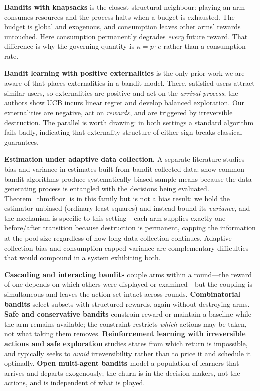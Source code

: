 \textbf{Bandits with knapsacks} \citep{badanidiyuru2013} is the closest structural
neighbour: playing an arm consumes resources and the process halts when a budget is
exhausted. The budget is global and exogenous, and consumption leaves other arms'
rewards untouched. Here consumption permanently degrades \emph{every} future
reward. That difference is why the governing quantity is $\kappa = p\cdot e$ rather
than a consumption rate.

\textbf{Bandit learning with positive externalities}
\citet{shah2018} is the only prior work we are aware of that places externalities in
a bandit model. There, satisfied users attract similar users, so externalities are
positive and act on the \emph{arrival process}; the authors show UCB incurs linear
regret and develop balanced exploration. Our externalities are negative, act on
\emph{rewards}, and are triggered by irreversible destruction. The parallel is
worth drawing: in both settings a standard algorithm fails badly, indicating that
externality structure of either sign breaks classical guarantees.

\textbf{Estimation under adaptive data collection.} A separate literature studies
bias and variance in estimates built from bandit-collected data:
\citet{nie2018} show common bandit algorithms produce systematically biased
sample means because the data-generating process is entangled with the
decisions being evaluated. Theorem~\ref{thm:floor} is in this family but is not
a bias result: we hold the estimator unbiased (ordinary least squares) and
instead bound its \emph{variance}, and the mechanism is specific to this
setting---each arm supplies exactly one before/after transition because
destruction is permanent, capping the information at the pool size regardless
of how long data collection continues. Adaptive-collection bias and
consumption-capped variance are complementary difficulties that would compound
in a system exhibiting both.

\textbf{Cascading and interacting bandits} couple arms within a round---the reward
of one depends on which others were displayed or examined---but the coupling is
simultaneous and leaves the action set intact across rounds. \textbf{Combinatorial
bandits} select subsets with structured rewards, again without destroying arms.
\textbf{Safe and conservative bandits} constrain reward or maintain a baseline while
the arm remains available; the constraint restricts \emph{which} actions may be
taken, not what taking them removes. \textbf{Reinforcement learning with
irreversible actions and safe exploration} studies states from which return is
impossible, and typically seeks to \emph{avoid} irreversibility rather than to price
it and schedule it optimally. \textbf{Open multi-agent bandits} model a population
of learners that arrives and departs exogenously; the churn is in the decision
makers, not the actions, and is independent of what is played.

